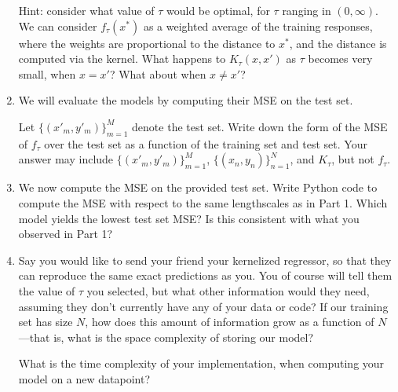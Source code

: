 \documentclass[submit]{harvardml}
\begin{document}
\begin{problem}
\begin{enumerate}
Hint: consider what value of $\tau$ would be optimal, for $\tau$ ranging in $(0, \infty)$. We can consider $f_\tau(x^*)$ as a weighted average of the training responses, where the weights are proportional to the distance to $x^*$, and the distance is computed via the kernel. What happens to $K_\tau(x, x')$ as $\tau$ becomes very small, when $x = x'$? What about when $x \neq x'$?

\item We will evaluate the models by computing their MSE on the test set. 

Let $\{(x'_m, y'_m)\}_{m = 1} ^M$ denote the test set. Write down the form of the MSE of $f_\tau$ over the test set as a function of the training set and test set. Your answer may include $\{(x'_m, y'_m)\}_{m = 1} ^M$, $\{(x_n, y_n)\}_{n = 1} ^N$, and $K_\tau$, but not $f_\tau$.

\item We now compute the MSE on the provided test set. Write Python code to compute the MSE with respect to the same lengthscales as in Part 1. Which model yields the lowest test set MSE? Is this consistent with what you observed in Part 1?

\item 
Say you would like to send your friend your kernelized regressor, so that they can reproduce the same exact predictions as you. You of course will tell them the value of $\tau$ you selected, but what other information would they need, assuming they don't currently have any of your data or code? If our training set has size $N$, how does this amount of information grow as a function of $N$—that is, what is the space complexity of storing our model?

What is the time complexity of your implementation, when computing your model on a new datapoint? 
\end{enumerate}

\end{problem}
\end{document}

